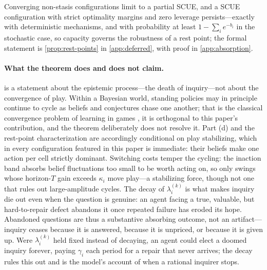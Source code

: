 \documentclass[11pt]{article}
\theoremstyle{definition}
\begin{document}
Converging non-stasis configurations limit to a partial SCUE, and a SCUE configuration with strict optimality margins and zero leverage persists---exactly with deterministic mechanisms, and with probability at least $1-\sum_i e^{-b_i}$ in the stochastic case, so capacity governs the robustness of a rest point; the formal statement is \cref{prop:rest-points} in \cref{app:deferred}, with proof in \cref{app:absorption}.

\paragraph{What the theorem does and does not claim.}
\label{rem:scope}
 is a statement about the epistemic process---the death of inquiry---not about the convergence of play.
Within a Bayesian world, standing policies may in principle continue to cycle as beliefs and conjectures chase one another; that is the classical convergence problem of learning in games \citep{FudenbergLevine1993,KalaiLehrer1993a}, it is orthogonal to this paper's contribution, and the theorem deliberately does not resolve it.
Part (d) and the rest-point characterization are accordingly conditional on play stabilizing, which in every configuration featured in this paper is immediate: their beliefs make one action per cell strictly dominant.
Switching costs temper the cycling: the inaction band absorbs belief fluctuations too small to be worth acting on, so only swings whose horizon-$T$ gain exceeds $\kappa_i$ move play---a stabilizing force, though not one that rules out large-amplitude cycles.
The decay of $\lambda_i^{(k)}$ is what makes inquiry die out even when the question is genuine: an agent facing a true, valuable, but hard-to-repair defect abandons it once repeated failure has eroded its hope.
Abandoned questions are thus a substantive absorbing outcome, not an artifact---inquiry ceases because it is answered, because it is unpriced, or because it is given up.
Were $\lambda_i^{(k)}$ held fixed instead of decaying, an agent could elect a doomed inquiry forever, paying $\gamma_i$ each period for a repair that never arrives; the decay rules this out and is the model's account of when a rational inquirer stops.
\end{document}
